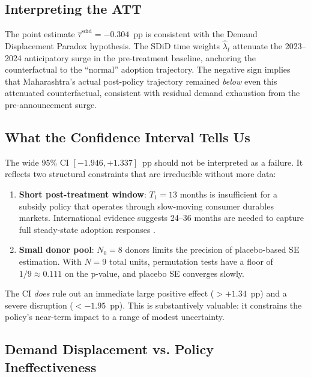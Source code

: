 \documentclass[journal]{IEEEtran}
\begin{document}
\subsection{Interpreting the ATT}

The point estimate $\hat{\tau}^{\mathrm{sdid}} = -0.304$~pp is consistent
with the Demand Displacement Paradox hypothesis. The SDiD time weights
$\hat{\lambda}_t$ attenuate the 2023--2024 anticipatory surge in the 
pre-treatment baseline, anchoring the counterfactual to the ``normal'' 
adoption trajectory. The negative sign implies that Maharashtra's actual
post-policy trajectory remained \emph{below} even this attenuated
counterfactual, consistent with residual demand exhaustion from the
pre-announcement surge.

\subsection{What the Confidence Interval Tells Us}

The wide 95\% CI $[-1.946, +1.337]$~pp should not be interpreted as a 
failure. It reflects two structural constraints that are irreducible without 
more data:

\begin{enumerate}
  \item \textbf{Short post-treatment window}: $T_1 = 13$ months is 
        insufficient for a subsidy policy that operates through 
        slow-moving consumer durables markets. International evidence 
        suggests 24--36 months are needed to capture full steady-state 
        adoption responses \citep{Muehlegger2022}.
  \item \textbf{Small donor pool}: $N_0 = 8$ donors limits the precision 
        of placebo-based SE estimation. With $N = 9$ total units, 
        permutation tests have a floor of $1/9 \approx 0.111$ on the 
        p-value, and placebo SE converges slowly.
\end{enumerate}

The CI \emph{does} rule out an immediate large positive effect 
($> +1.34$~pp) and a severe disruption ($< -1.95$~pp). This is 
substantively valuable: it constrains the policy's near-term impact to a 
range of modest uncertainty.

\subsection{Demand Displacement vs. Policy Ineffectiveness}
\end{document}
